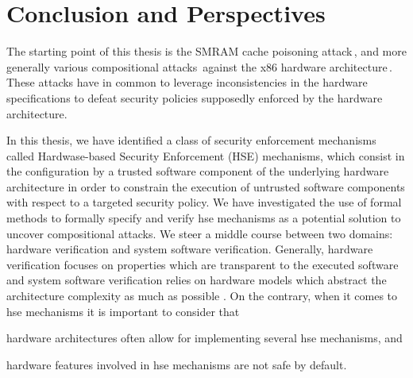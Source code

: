 \chapter{Conclusion and Perspectives}
\label{chapter:conclusion}


\vspace{1cm}%
\noindent
%
The starting point of this thesis is the SMRAM cache poisoning
attack\,\cite{duflot2009smram,wojtczuk2009smram}, and more generally various
compositional attacks\,\cite{wing2003compositionalattack} against the x86
hardware
architecture\,\cite{kovah2015senter,domas2015sinkhole,kallenberg2015racecondition}.
%
These attacks have in common to leverage inconsistencies in the hardware
specifications to defeat security policies supposedly enforced by the hardware
architecture.

In this thesis, we have identified a class of security enforcement mechanisms
called Hardwase-based Security Enforcement (HSE) mechanisms, which consist in
the configuration by a trusted software component of the underlying hardware
architecture in order to constrain the execution of untrusted software
components with respect to a targeted security policy.
%
We have investigated the use of formal methods to formally specify and verify
\ac{hse} mechanisms as a potential solution to uncover compositional attacks.
%
We steer a middle course between two domains: hardware verification and system
software verification.
%
Generally, hardware verification focuses on properties which are transparent to
the executed software and system software verification relies on hardware models
which abstract the architecture complexity as much as possible .
%
On the contrary, when it comes to \ac{hse} mechanisms it is important to
consider that
%
\begin{inparaenum}[(1)]
\item \label{needreuse}%
  hardware architectures often allow for implementing several \ac{hse}
  mechanisms, and
\item \label{needreduce}%
  hardware features involved in \ac{hse} mechanisms are not safe by default.
\end{inparaenum}

